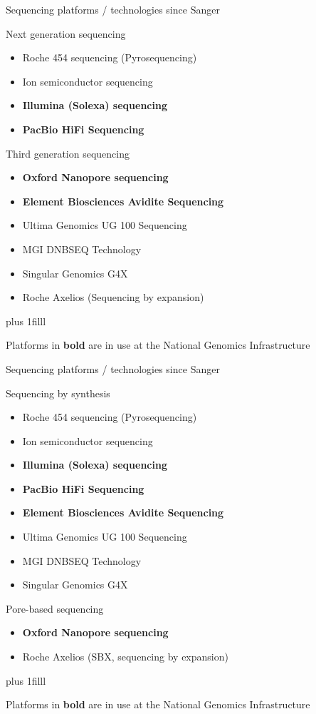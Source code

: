 \documentclass[10pt]{beamer}
\newcommand{\credit}[1]{{\vskip0pt plus 1filll \par \raggedleft \scriptsize \mdseries \color{mDarkBrown} #1 \par}}
\begin{document}
\begin{frame}{Sequencing platforms / technologies since Sanger}
	\begin{exampleblock}{Next generation sequencing}
		\begin{itemize}
			\item Roche 454 sequencing (Pyrosequencing)
			\item Ion semiconductor sequencing
			\item \textbf{Illumina (Solexa) sequencing}
			\item \textbf{PacBio HiFi Sequencing}
		\end{itemize}
	\end{exampleblock}
	\begin{alertblock}{Third generation sequencing}
		\begin{itemize}
			\item \textbf{Oxford Nanopore sequencing}
			\item \textbf{Element Biosciences Avidite Sequencing}
			\item Ultima Genomics UG 100 Sequencing
			\item MGI DNBSEQ Technology
			\item Singular Genomics G4X
			\item Roche Axelios (Sequencing by expansion)
		\end{itemize}
	\end{alertblock}
	\credit{Platforms in \textbf{bold} are in use at the National Genomics Infrastructure}
\end{frame}

\begin{frame}{Sequencing platforms / technologies since Sanger}
	\begin{exampleblock}{Sequencing by synthesis}
		\begin{itemize}
			\item Roche 454 sequencing (Pyrosequencing)
			\item Ion semiconductor sequencing
			\item \textbf{Illumina (Solexa) sequencing}
			\item \textbf{PacBio HiFi Sequencing}
			\item \textbf{Element Biosciences Avidite Sequencing}
			\item Ultima Genomics UG 100 Sequencing
			\item MGI DNBSEQ Technology
			\item Singular Genomics G4X
		\end{itemize}
	\end{exampleblock}
	\begin{alertblock}{Pore-based sequencing}
		\begin{itemize}
			\item \textbf{Oxford Nanopore sequencing}
			\item Roche Axelios (SBX, sequencing by expansion)
		\end{itemize}
	\end{alertblock}
	\credit{Platforms in \textbf{bold} are in use at the National Genomics Infrastructure}
\end{frame}
\end{document}
